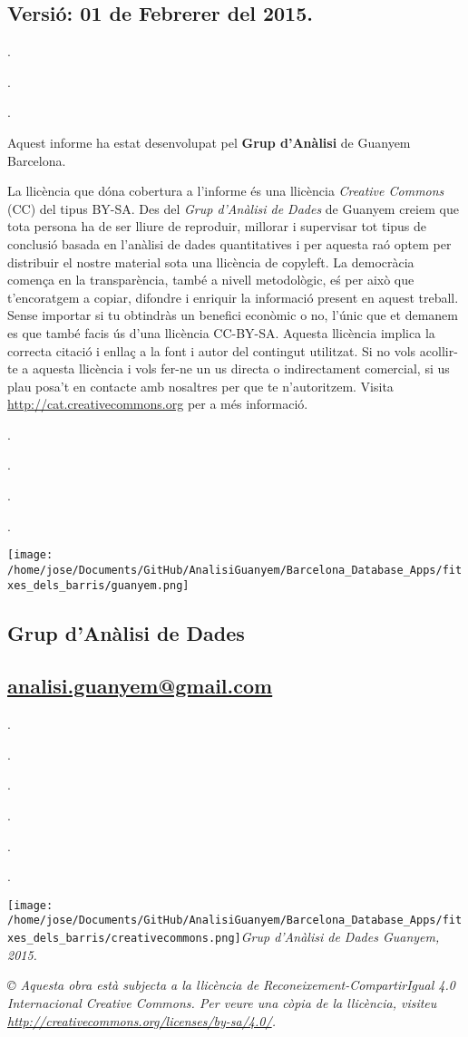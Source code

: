 \documentclass[]{article}
\begin{document}
\subsection{Versió: 01 de Febrerer del
2015.}\label{versio-01-de-febrerer-del-2015.}

.

.

.

Aquest informe ha estat desenvolupat pel \textbf{Grup d'Anàlisi} de
Guanyem Barcelona.

La llicència que dóna cobertura a l'informe és una llicència
\emph{Creative Commons} (CC) del tipus BY-SA. Des del \emph{Grup
d'Anàlisi de Dades} de Guanyem creiem que tota persona ha de ser lliure
de reproduir, millorar i supervisar tot tipus de conclusió basada en
l'anàlisi de dades quantitatives i per aquesta raó optem per distribuir
el nostre material sota una llicència de copyleft. La democràcia comença
en la transparència, també a nivell metodològic, eś per això que
t'encoratgem a copiar, difondre i enriquir la informació present en
aquest treball. Sense importar si tu obtindràs un benefici econòmic o
no, l'únic que et demanem es que també facis ús d'una llicència
CC-BY-SA. Aquesta llicència implica la correcta citació i enllaç a la
font i autor del contingut utilitzat. Si no vols acollir-te a aquesta
llicència i vols fer-ne un us directa o indirectament comercial, si us
plau posa't en contacte amb nosaltres per que te n'autoritzem. Visita
\url{http://cat.creativecommons.org} per a més informació.

.

.

.

.

\texttt{[image: /home/jose/Documents/GitHub/AnalisiGuanyem/Barcelona\_Database\_Apps/fitxes\_dels\_barris/guanyem.png]}

\subsection{\textbf{Grup d'Anàlisi de
Dades}}\label{grup-danalisi-de-dades}

\subsection{\href{mailto:analisi.guanyem@gmail.com}{analisi.guanyem@gmail.com}}\label{analisi.guanyemgmail.com}

.

.

.

.

.

.

\texttt{[image: /home/jose/Documents/GitHub/AnalisiGuanyem/Barcelona\_Database\_Apps/fitxes\_dels\_barris/creativecommons.png]}\emph{Grup
d'Anàlisi de Dades Guanyem, 2015.}

\emph{© Aquesta obra està subjecta a la llicència de
Reconeixement-CompartirIgual 4.0 Internacional Creative Commons. Per
veure una còpia de la llicència, visiteu
\url{http://creativecommons.org/licenses/by-sa/4.0/}.}
\end{document}
